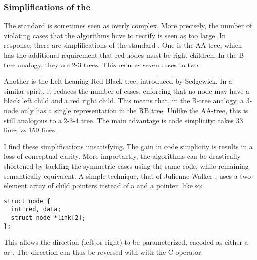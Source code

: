 \subsubsection{Simplifications of the \RBt}

The standard \RBt is sometimes seen as overly complex.
More precisely,
  the number of violating cases that the algorithms have to rectify
  is seen as too large.
In response, there are simplifications of the standard \RBt.
One is the AA-tree,
  which has the additional requirement that
  red nodes must be right children.
In the B-tree analogy, they are 2-3 trees.
This reduces seven cases to two.

Another is the Left-Leaning Red-Black tree,
  introduced by Sedgewick.
In a similar spirit,
  it reduces the number of cases,
  enforcing that
  no node may have a black left child and a red right child.
This means that, in the B-tree analogy,
  a 3-node only has a single representation in the RB tree.
Unlike the AA-tree, this is still analogous to a 2-3-4 tree.
The main advantage is code simplicity:
   takes 33 lines vs 150 lines.

I find these simplifications unsatisfying.
The gain in code simplicity is results in a loss of conceptual clarity.
More importantly, the \RBt algorithms can be drastically shortened
  by tackling the symmetric cases using the same code,
  while remaining semantically equivalent.
A simple technique,
  that of Julienne Walker \cite{jsw},
  uses a two-element array of child pointers
  instead of a  and a  pointer, like so:

\begin{verbatim}
struct node {
  int red, data;
  struct node *link[2];
};
\end{verbatim}

This allows the direction (left or right) to be parameterized,
  encoded as either a  or .
The direction can thus be reversed with with the C \IC{!} operator.
